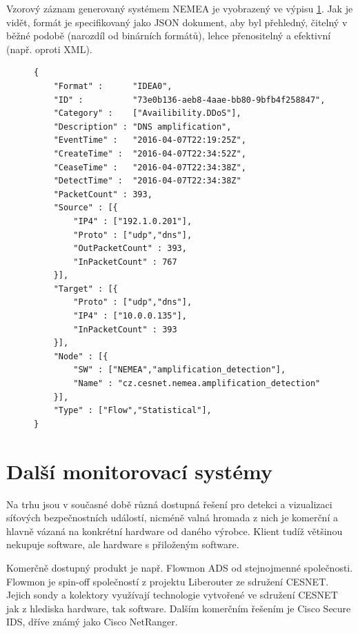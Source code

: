 Vzorový záznam generovaný systémem NEMEA je vyobrazený ve výpisu \ref{code:idea}. Jak je vidět, formát je specifikovaný jako JSON dokument, aby byl přehledný, čitelný v běžné podobě (narozdíl od binárních formátů), lehce přenositelný a efektivní (např. oproti XML\cite{xmlvsjson}).

\begin{figure}[ht]
\lstset{basicstyle=\small,style=JSON}
\begin{lstlisting}
{
    "Format" :      "IDEA0",
    "ID" :          "73e0b136-aeb8-4aae-bb80-9bfb4f258847",
    "Category" :    ["Availibility.DDoS"],
    "Description" : "DNS amplification",
    "EventTime" :   "2016-04-07T22:19:25Z",
    "CreateTime" :  "2016-04-07T22:34:52Z",
    "CeaseTime" :   "2016-04-07T22:34:38Z",
    "DetectTime" :  "2016-04-07T22:34:38Z"
    "PacketCount" : 393,
    "Source" : [{
        "IP4" : ["192.1.0.201"],
        "Proto" : ["udp","dns"],
        "OutPacketCount" : 393,
        "InPacketCount" : 767
    }],
    "Target" : [{
        "Proto" : ["udp","dns"],
        "IP4" : ["10.0.0.135"],
        "InPacketCount" : 393
    }],
    "Node" : [{
        "SW" : ["NEMEA","amplification_detection"],
        "Name" : "cz.cesnet.nemea.amplification_detection"
    }],
    "Type" : ["Flow","Statistical"],
}
\end{lstlisting}
\label{code:idea}
\end{figure}

\newpage

\section{Další monitorovací systémy}

Na trhu jsou v současné době různá dostupná řešení pro detekci a vizualizaci síťových bezpečnostních událostí, nicméně valná hromada z nich je komerční a hlavně vázaná na konkrétní hardware od daného výrobce. Klient tudíž většinou nekupuje software, ale hardware s přiloženým software.

Komerčně dostupný produkt je např. Flowmon\cite{flowmon:report} ADS\cite{flowmon:ads} od stejnojmenné společnosti. Flowmon je spin-off společností z projektu Liberouter ze sdružení CESNET. Jejich sondy a kolektory využívají technologie vytvořené ve sdružení CESNET jak z hlediska hardware, tak software. Dalším komerčním řešením je Cisco Secure IDS\cite{cisco:ids}, dříve známý jako Cisco NetRanger.

